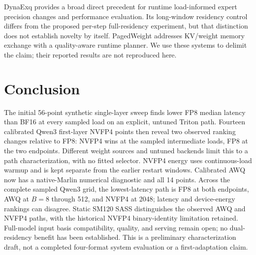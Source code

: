 \documentclass[10pt,twocolumn]{article}
\begin{document}
DynaExq provides a broad direct precedent for runtime load-informed expert
precision changes and performance evaluation. Its long-window residency
control differs from the proposed per-step full-residency experiment, but
that distinction does not establish novelty by itself. PagedWeight addresses
KV/weight memory exchange with a quality-aware runtime planner. We use these
systems to delimit the claim; their reported results are not reproduced here.



\section{Conclusion}
The initial 56-point synthetic single-layer sweep finds lower FP8 median
latency than BF16 at every sampled load on an explicit, untuned Triton path.
Fourteen calibrated Qwen3 first-layer NVFP4 points then reveal two observed
ranking changes relative to FP8: NVFP4 wins at the sampled intermediate
loads, FP8 at the two endpoints. Different weight sources and untuned
backends limit this to a path characterization, with no fitted selector.
NVFP4 energy uses continuous-load warmup and is kept separate from the
earlier restart windows. Calibrated AWQ now has a native-Marlin numerical
diagnostic and all 14 points. Across the complete sampled Qwen3 grid,
the lowest-latency path is FP8 at both endpoints, AWQ at $B=8$ through 512,
and NVFP4 at 2048; latency and device-energy rankings can disagree.
Static SM120 SASS distinguishes the observed AWQ and NVFP4 paths, with
the historical NVFP4 binary-identity limitation retained. Full-model input
basis compatibility, quality, and serving remain open; no dual-residency
benefit has been established. This is a preliminary characterization draft,
not a completed four-format system evaluation or a first-adaptation claim.
\end{document}
